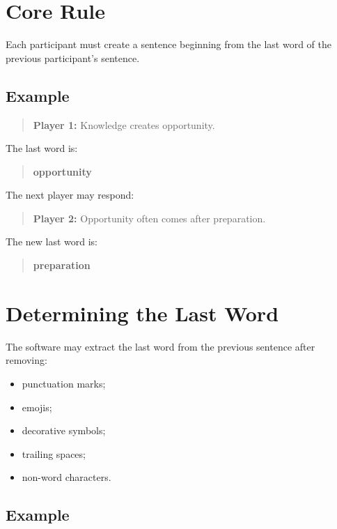 \documentclass[11pt,a4paper]{article}
\begin{document}
\section{Core Rule}

Each participant must create a sentence beginning from the last word of the previous participant's sentence.

\subsection{Example}

\begin{quote}
\textbf{Player 1:} Knowledge creates opportunity.
\end{quote}

The last word is:

\begin{quote}
\textbf{opportunity}
\end{quote}

The next player may respond:

\begin{quote}
\textbf{Player 2:} Opportunity often comes after preparation.
\end{quote}

The new last word is:

\begin{quote}
\textbf{preparation}
\end{quote}

\section{Determining the Last Word}

The software may extract the last word from the previous sentence after removing:

\begin{itemize}
    \item punctuation marks;
    \item emojis;
    \item decorative symbols;
    \item trailing spaces;
    \item non-word characters.
\end{itemize}

\subsection{Example}
\end{document}
